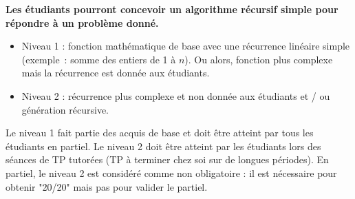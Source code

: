 \documentclass{../cours}
\begin{document}
\begin{aav}
\textbf{Les étudiants pourront concevoir un algorithme récursif simple pour répondre à un problème donné.}
\begin{itemize}
\item Niveau 1 : fonction mathématique de base avec une récurrence linéaire simple (exemple~: somme des entiers de 1 à $n$). Ou alors, fonction plus complexe mais la récurrence est donnée aux étudiants.
\item Niveau 2 : récurrence plus complexe et non donnée aux étudiants et / ou génération récursive.
\end{itemize}

Le niveau 1 fait partie des acquis de base et doit être atteint par tous les étudiants en partiel. Le niveau 2 doit être atteint par les étudiants lors des séances de TP tutorées (TP à terminer chez soi sur de longues périodes). En partiel, le niveau 2 est considéré comme non obligatoire : il est nécessaire pour obtenir "20/20" mais pas pour valider le partiel.
\end{aav}
\end{document}
